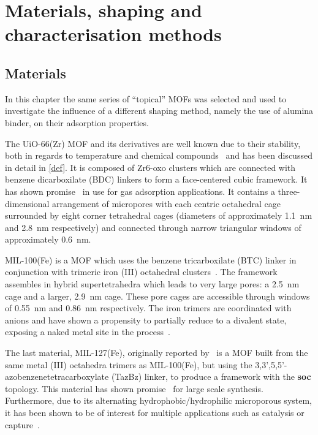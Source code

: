 
\section{Materials, shaping and characterisation methods}

\subsection{Materials}

In this chapter the same series of ``topical'' MOFs was selected and
used to investigate the influence of a different shaping method, namely
the use of alumina binder, on their adsorption properties.

The UiO-66(Zr) MOF and its derivatives are well known due to their
stability, both in regards to temperature and chemical
compounds~\cite{cavkaNewZirconiumInorganic2008} and has been
discussed in detail in \autoref{def}. It is composed of
Zr6-oxo clusters which are connected with benzene dicarboxilate
(BDC) linkers to form a face-centered cubic framework. It has
shown promise~\cite{wiersumEvaluationUiO66GasBased2011}
in use for gas adsorption applications. It contains a
three-dimensional arrangement of micropores with each centric
octahedral cage surrounded by eight corner tetrahedral cages
(diameters of approximately \SI{1.1}{\nano\metre} and \SI{2.8}{\nano\metre}
respectively) and connected through narrow triangular windows
of approximately \SI{0.6}{\nano\metre}.

MIL-100(Fe) is a MOF which uses the benzene tricarboxilate (BTC) linker
in conjunction with trimeric iron (III) octahedral
clusters~\cite{horcajadaSynthesisCatalyticProperties2007,%
	YangWaterStableMetalOrganic2013}.
The framework assembles in hybrid supertetrahedra which leads to very
large pores: a \SI{2.5}{\nano\metre} cage and a larger, \SI{2.9}{\nano\metre}
cage. These pore cages are accessible through windows of
\SI{0.55}{\nano\metre} and \SI{0.86}{\nano\metre} respectively.
The iron trimers are coordinated with
anions and have shown a propensity to partially reduce to a divalent
 state, exposing a naked metal site in the
process~\cite{yoonControlledReducibilityMetalOrganic2010}.

The last material, MIL-127(Fe), originally reported
by~\citet{liuAssemblyMetalOrganic2007} is a MOF built from the same
metal (III) octahedra trimers as MIL-100(Fe), but using the
3,3',5,5'-azobenzenetetracarboxylate (TazBz) linker, to produce a
framework with the \textbf{soc} topology. This material has shown
promise~\cite{chevreauSynthesisBiocompatibleHighly2016}
for large scale synthesis. Furthermore, due to its alternating
hydrophobic/hydrophilic microporous system, it has been shown to be
of interest for multiple applications such as catalysis or
 capture~\cite{chanutScreeningEffectWater2017}.

